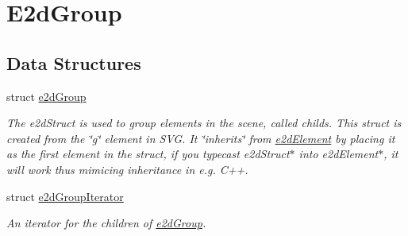 \hypertarget{group__e2d_group}{\section{E2d\-Group}
\label{group__e2d_group}
}
\subsection*{Data Structures}
\begin{DoxyCompactItemize}
\item 
struct \hyperlink{structe2d_group}{e2d\-Group}
\begin{DoxyCompactList}\small\item\em The e2d\-Struct is used to group elements in the scene, called childs. This struct is created from the \char`\"{}g\char`\"{} element in S\-V\-G. It \char`\"{}inherits\char`\"{} from \hyperlink{structe2d_element}{e2d\-Element} by placing it as the first element in the struct, if you typecast e2d\-Struct$\ast$ into e2d\-Element$\ast$, it will work thus mimicing inheritance in e.\-g. C++. \end{DoxyCompactList}\item 
struct \hyperlink{structe2d_group_iterator}{e2d\-Group\-Iterator}
\begin{DoxyCompactList}\small\item\em An iterator for the children of \hyperlink{structe2d_group}{e2d\-Group}. \end{DoxyCompactList}\end{DoxyCompactItemize}
